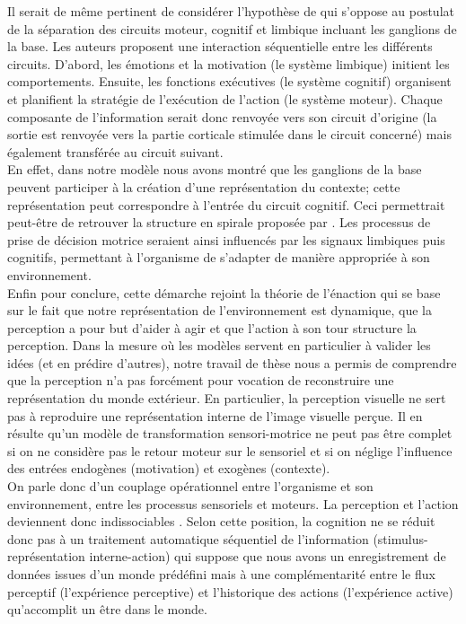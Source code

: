 Il serait de même pertinent de considérer l'hypothèse de \cite{Haber:2003} qui s'oppose au postulat de la séparation des circuits moteur, cognitif et limbique incluant les ganglions de la base. Les auteurs proposent une interaction séquentielle entre les différents circuits. D'abord, les émotions et la motivation (le système limbique) initient les comportements. Ensuite, les fonctions exécutives (le système cognitif) organisent et planifient la stratégie de l'exécution de l'action (le système moteur). Chaque composante de l'information serait donc renvoyée vers son circuit d'origine (la sortie est renvoyée vers la partie corticale stimulée dans le circuit concerné) mais également transférée au circuit suivant.\\ %

En effet, dans notre modèle nous avons montré que les ganglions de la base peuvent participer à la création d'une représentation du contexte; cette représentation peut correspondre à l'entrée du circuit cognitif. Ceci permettrait peut-être de retrouver la structure en spirale proposée par \cite{Haber:2003}. Les processus de prise de décision motrice seraient ainsi influencés par les signaux limbiques puis cognitifs, permettant à l'organisme de s'adapter de manière appropriée à son environnement. \\  %

Enfin pour conclure, cette démarche rejoint la théorie de l'énaction qui se base sur le fait que notre représentation de l'environnement est dynamique, que la perception a pour but d'aider à agir et que l'action à son tour structure la perception. Dans la mesure o\`u les modèles servent en particulier à valider les idées (et en prédire d'autres), notre travail de thèse nous a permis de comprendre que la perception n'a pas forcément pour vocation de reconstruire une représentation du monde extérieur. En particulier, la perception visuelle ne sert pas à reproduire une représentation interne de l'image visuelle perçue. Il en résulte qu'un modèle de transformation sensori-motrice ne peut pas être complet si on ne considère pas le retour moteur sur le sensoriel et si on néglige l'influence des entrées endogènes (motivation) et exogènes (contexte).\\%

On parle donc d'un couplage opérationnel entre l'organisme et son environnement, entre les processus sensoriels et moteurs. La perception et l'action deviennent donc indissociables \cite{Varela:1993}. Selon cette position, la cognition ne se réduit donc pas à un traitement automatique séquentiel de l'information (stimulus-représentation interne-action) qui suppose que nous avons un enregistrement de données issues d'un monde prédéfini mais à une complémentarité entre le flux perceptif (l'expérience perceptive) et l'historique des actions (l'expérience active) qu'accomplit un être dans le monde.\\%


